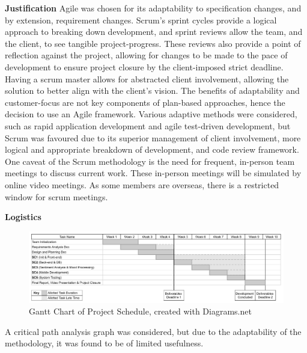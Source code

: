\documentclass[9pt, titlepage]{extarticle}
\begin{document}
\textbf{Justification}\newline
Agile was chosen for its adaptability to specification changes, and by extension, requirement changes. 
Scrum’s sprint cycles provide a logical approach to breaking down development, and sprint reviews allow the team, and the client, to see tangible project-progress. These reviews also provide a point of reflection against the project, allowing for changes to be made to the pace of development to ensure project closure by the client-imposed strict deadline. 
Having a scrum master allows for abstracted client involvement, allowing the solution to better align with the client's vision. 
The benefits of adaptability and customer-focus are not key components of plan-based approaches, hence the decision to use an Agile framework.
Various adaptive methods were considered, such as rapid application development and agile test-driven development, but Scrum was favoured due to its superior management of client involvement, more logical and appropriate breakdown of development, and code review framework. One caveat of the Scrum methodology is the need for frequent, in-person team meetings to discuss current work. These in-person meetings will be simulated by online video meetings. As some members are overseas, there is a restricted window for scrum meetings. \newline


\textbf{Logistics} \label{group:logistics}

\begin{figure}[h!]
    \centering
    \includegraphics[width=\textwidth]{assets/gantt.png}
    \caption{Gantt Chart of Project Schedule, created with Diagrams.net \autocite{web:drawio}}
    \label{fig:gantt}
\end{figure}

A critical path analysis graph was considered, but due to the adaptability of the methodology, it was found to be of limited usefulness.\\
\end{document}
